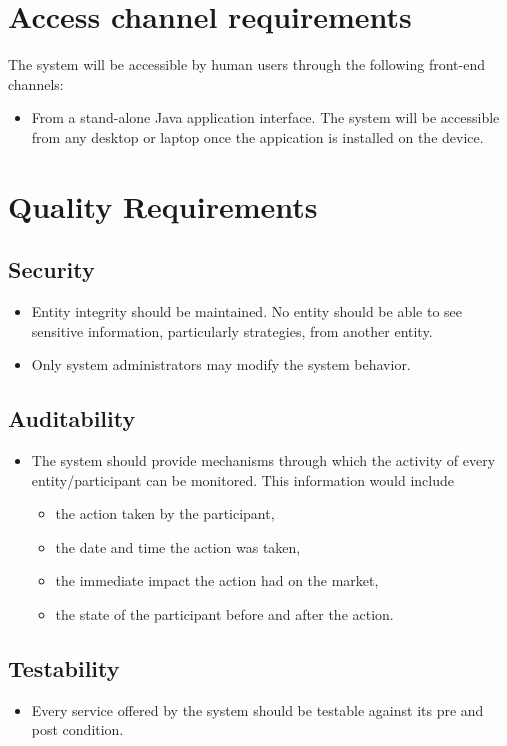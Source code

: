 \documentclass[12pt]{article}
\begin{document}
	\section{Access channel requirements}
	The system will be accessible by human users through the following front-end channels:
	\begin{itemize}
	\item From a stand-alone Java application interface. The system will be accessible from any desktop or laptop once the appication is installed on the device.
	\end{itemize}
	
	\section{Quality Requirements}
		\subsection{Security}
		\begin{itemize}
		\item Entity integrity should be maintained. No entity should be able to see sensitive information, particularly strategies, from another entity.
		\item Only system administrators may modify the system behavior.
		\end{itemize}
		\subsection{Auditability}
		\begin{itemize}
		\item The system should provide mechanisms through which the activity of every entity/participant can be monitored. This information would include
			\begin{itemize}
			\item the action taken by the participant, 
			\item the date and time the action was taken, 
			\item the immediate impact the action had on the market,
			\item the state of the participant before and after the action.
			\end{itemize}
		\end{itemize}
		\subsection{Testability}
		\begin{itemize}
		\item Every service offered by the system should be testable against its pre and post condition.
		\end{itemize}
\end{document}
